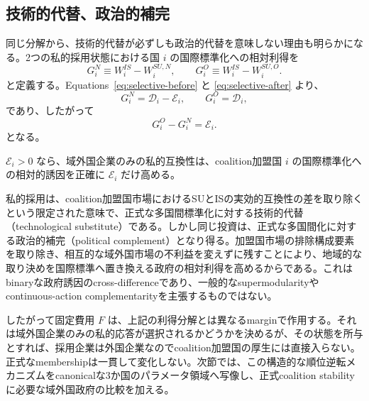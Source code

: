 \subsection{技術的代替、政治的補完}
\label{subsec:selective-political-complement}

同じ分解から、技術的代替が必ずしも政治的代替を意味しない理由も明らかになる。2つの私的採用状態における国 $i$ の国際標準化への相対利得を
\begin{equation}
    G_i^N\equiv W_i^{IS}-W_i^{SU,N},
    \qquad
    G_i^O\equiv W_i^{IS}-W_i^{SU,O}.
    \label{eq:government-is-incentives}
\end{equation}
と定義する。Equations~\eqref{eq:selective-before} と \eqref{eq:selective-after} より、
\begin{equation}
    G_i^N=\mathscr D_i-\mathscr E_i,
    \qquad
    G_i^O=\mathscr D_i,
    \label{eq:government-is-incentive-levels}
\end{equation}
であり、したがって
\begin{equation}
    \boxed{
    G_i^O-G_i^N=\mathscr E_i.
    }
    \label{eq:political-incentive-cross-difference}
\end{equation}
となる。

\begin{corollary}
\label{cor:technological-political}
$\mathscr E_i>0$ なら、域外国企業のみの私的互換性は、coalition加盟国 $i$ の国際標準化への相対的誘因を正確に $\mathscr E_i$ だけ高める。
\end{corollary}

私的採用は、coalition加盟国市場におけるSUとISの実効的互換性の差を取り除くという限定された意味で、正式な多国間標準化に対する技術的代替（technological substitute）である。しかし同じ投資は、正式な多国間化に対する政治的補完（political complement）となり得る。加盟国市場の排除構成要素を取り除き、相互的な域外国市場の不利益を変えずに残すことにより、地域的な取り決めを国際標準へ置き換える政府の相対利得を高めるからである。これはbinaryな政府誘因のcross-differenceであり、一般的なsupermodularityやcontinuous-action complementarityを主張するものではない。

したがって固定費用 $F$ は、上記の利得分解とは異なるmarginで作用する。それは域外国企業のみの私的応答が選択されるかどうかを決めるが、その状態を所与とすれば、採用企業は外国企業なのでcoalition加盟国の厚生には直接入らない。正式なmembershipは一貫して変化しない。次節では、この構造的な順位逆転メカニズムをcanonicalな3か国のパラメータ領域へ写像し、正式coalition stabilityに必要な域外国政府の比較を加える。
